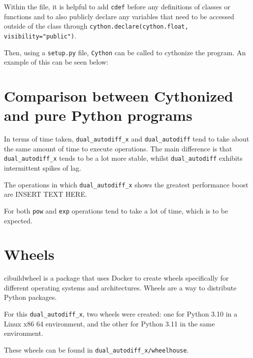 \documentclass[11pt,a4paper]{article}
\begin{document}
Within the file, it is helpful to add \texttt{cdef} before any definitions of classes or functions and to also publicly declare any variables that need to be accessed outside of the class through \texttt{cython.declare(cython.float, visibility="public")}.

Then, using a \texttt{setup.py} file, \texttt{Cython} can be called to cythonize the program. An example of this can be seen below:



\section{Comparison between Cythonized and pure Python programs}


In terms of time taken, \texttt{dual\_autodiff\_x} and \texttt{dual\_autodiff} tend to take about the same amount of time to execute operations. The main difference is that \texttt{dual\_autodiff\_x} tends to be a lot more stable, whilst \texttt{dual\_autodiff} exhibits intermittent spikes of lag.

The operations in which \texttt{dual\_autodiff\_x} shows the greatest performance boost are INSERT TEXT HERE.

For both \texttt{pow} and \texttt{exp} operations tend to take a lot of time, which is to be expected.



\section{Wheels}

cibuildwheel is a package that uses Docker to create wheels specifically for different operating systems and architectures. Wheels are a way to distribute Python packages.

For this \texttt{dual\_autodiff\_x}, two wheels were created: one for Python 3.10 in a Linux x86 64 environment, and the other for Python 3.11 in the same environment.

These wheels can be found in \texttt{dual\_autodiff\_x/wheelhouse}.
\end{document}
